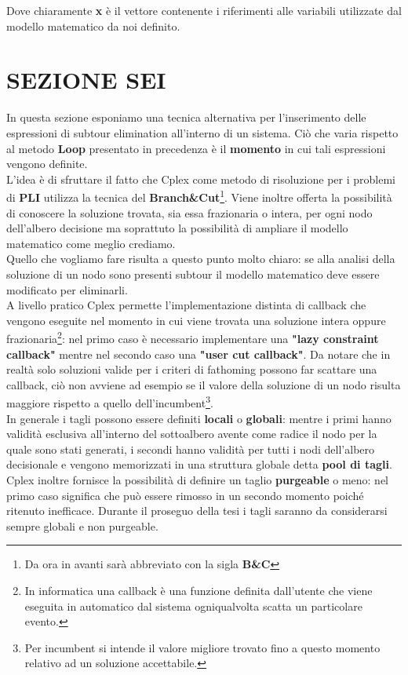 \documentclass[11pt]{article}
\begin{document}
Dove chiaramente \textbf{x} è il vettore contenente i riferimenti alle variabili utilizzate dal modello matematico da noi definito.

\section*{SEZIONE SEI}

In questa sezione esponiamo una tecnica alternativa per l'inserimento delle espressioni di subtour elimination all'interno di un sistema. Ciò che varia rispetto al metodo \textbf{Loop} presentato in precedenza è il \textbf{momento} in cui tali espressioni vengono definite.\\
L'idea è di sfruttare il fatto che Cplex come metodo di risoluzione per i problemi di \textbf{PLI} utilizza la tecnica del \textbf{Branch\&Cut}\footnote{Da ora in avanti sarà abbreviato con la sigla \textbf{B\&C}}. Viene inoltre offerta la possibilità di conoscere la soluzione trovata, sia essa frazionaria o intera, per ogni nodo dell'albero decisione ma soprattuto la possibilità di ampliare il modello matematico come meglio crediamo.\\
Quello che vogliamo fare risulta a questo punto molto chiaro: se alla analisi della soluzione di un nodo sono presenti subtour il modello matematico deve essere modificato per eliminarli.\\
A livello pratico Cplex permette l'implementazione distinta di callback che vengono eseguite nel momento in cui viene trovata una soluzione intera oppure frazionaria\footnote{In informatica una callback è una funzione definita dall'utente che viene eseguita in automatico dal sistema ogniqualvolta scatta un particolare evento.}: nel primo caso è necessario implementare una \textbf{"lazy constraint callback"} mentre nel secondo caso una \textbf{"user cut callback"}. Da notare che in realtà solo soluzioni valide per i criteri di fathoming possono far scattare una callback, ciò non avviene ad esempio se il valore della soluzione di un nodo risulta maggiore rispetto a quello dell'incumbent\footnote{Per incumbent si intende il valore migliore trovato fino a questo momento relativo ad un soluzione accettabile.}.\\
In generale i tagli possono essere definiti \textbf{locali} o \textbf{globali}: mentre i primi hanno validità esclusiva all'interno del sottoalbero avente come radice il nodo per la quale sono stati generati, i secondi hanno validità per tutti i nodi dell'albero decisionale e vengono memorizzati in una struttura globale detta \textbf{pool di tagli}. Cplex inoltre fornisce la possibilità di definire un taglio \textbf{purgeable} o meno: nel primo caso significa che può essere rimosso in un secondo momento poiché ritenuto inefficace. Durante il proseguo della tesi i tagli saranno da considerarsi sempre globali e non purgeable.
\end{document}
